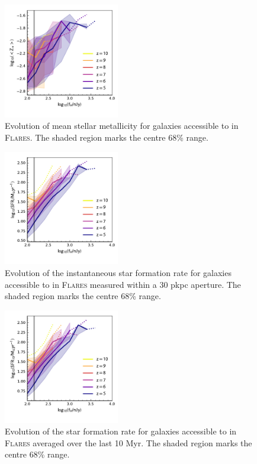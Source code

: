 \begin{figure}
	\centering
	\includegraphics[width=0.45\textwidth]{figures/physical/zevo_S_Z.pdf}
	\caption{Evolution of mean stellar metallicity for galaxies accessible to \euclid \: in \textsc{Flares}. The shaded region marks the centre 68\% range.}
	\label{fig:physical:sz_zevo}
\end{figure}

\begin{figure}
	\centering
	\includegraphics[width=0.45\textwidth]{figures/physical/zevo_SFR_inst_30.pdf}
	\caption{Evolution of the instantaneous star formation rate for galaxies accessible to \euclid \: in \textsc{Flares} measured within a 30 pkpc aperture. The shaded region marks the centre 68\% range.}
	\label{fig:physical:sfr_zevo_inst}
\end{figure}

\begin{figure}
	\centering
	\includegraphics[width=0.45\textwidth]{figures/physical/zevo_SFR_SFR_10.pdf}
	\caption{Evolution of the star formation rate for galaxies accessible to \euclid \: in \textsc{Flares} averaged over the last 10 Myr. The shaded region marks the centre 68\% range.}
	\label{fig:physical:sfr_zevo_10}
\end{figure}

